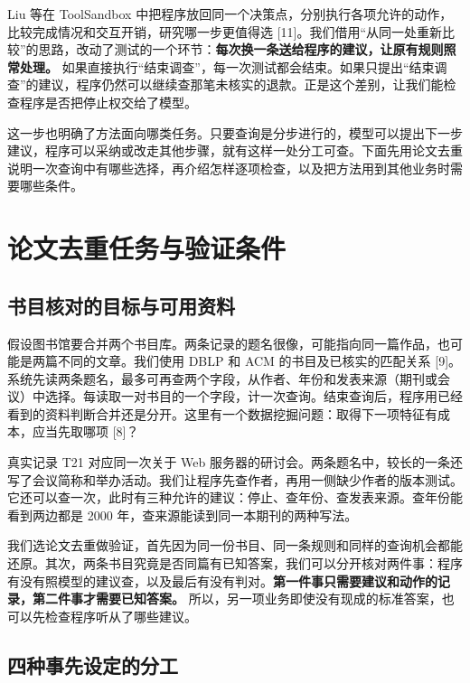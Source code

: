 \documentclass[UTF8,12pt,a4paper,fontset=none]{ctexart}
\begin{document}
Liu 等在 ToolSandbox 中把程序放回同一个决策点，分别执行各项允许的动作，比较完成情况和交互开销，研究哪一步更值得选 [11]。我们借用“从同一处重新比较”的思路，改动了测试的一个环节：\textbf{每次换一条送给程序的建议，让原有规则照常处理。} 如果直接执行“结束调查”，每一次测试都会结束。如果只提出“结束调查”的建议，程序仍然可以继续查那笔未核实的退款。正是这个差别，让我们能检查程序是否把停止权交给了模型。\par

这一步也明确了方法面向哪类任务。只要查询是分步进行的，模型可以提出下一步建议，程序可以采纳或改走其他步骤，就有这样一处分工可查。下面先用论文去重说明一次查询中有哪些选择，再介绍怎样逐项检查，以及把方法用到其他业务时需要哪些条件。\par

\section{论文去重任务与验证条件}

\subsection{书目核对的目标与可用资料}

假设图书馆要合并两个书目库。两条记录的题名很像，可能指向同一篇作品，也可能是两篇不同的文章。我们使用 DBLP 和 ACM 的书目及已核实的匹配关系 [9]。系统先读两条题名，最多可再查两个字段，从作者、年份和发表来源（期刊或会议）中选择。每读取一对书目的一个字段，计一次查询。结束查询后，程序用已经看到的资料判断合并还是分开。这里有一个数据挖掘问题：取得下一项特征有成本，应当先取哪项 [8]？\par

真实记录 T21 对应同一次关于 Web 服务器的研讨会。两条题名中，较长的一条还写了会议简称和举办活动。我们让程序先查作者，再用一侧缺少作者的版本测试。它还可以查一次，此时有三种允许的建议：停止、查年份、查发表来源。查年份能看到两边都是 2000 年，查来源能读到同一本期刊的两种写法。\par

我们选论文去重做验证，首先因为同一份书目、同一条规则和同样的查询机会都能还原。其次，两条书目究竟是否同篇有已知答案，我们可以分开核对两件事：程序有没有照模型的建议查，以及最后有没有判对。\textbf{第一件事只需要建议和动作的记录，第二件事才需要已知答案。} 所以，另一项业务即使没有现成的标准答案，也可以先检查程序听从了哪些建议。\par

\subsection{四种事先设定的分工}
\end{document}
